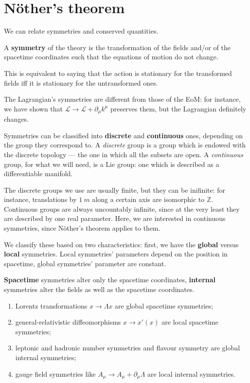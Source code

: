\documentclass[main.tex]{subfiles}
\begin{document}
\section{Nöther's theorem}


We can relate symmetries and conserved quantities. 

\begin{definition}
A \textbf{symmetry} of the theory is the transformation of the fields and/or of the spacetime coordinates such that the equations of motion do not change.
\end{definition}

This is equivalent to saying that the action is stationary for the transformed fields iff it is stationary for the untransformed ones. 

The Lagrangian's symmetries are different from those of the EoM: for instance, we have shown that \(\mathscr{L} \to \mathscr{L} + \partial_{\mu } k^{\mu }\) preserves them, but the Lagrangian definitely changes.

Symmetries can be classified into \textbf{discrete} and \textbf{continuous} ones, depending on the group they correspond to. 
A \emph{discrete} group is a group which is endowed with the discrete topology --- the one in which all the subsets are open. 
A \emph{continuous} group, for what we will need, is a Lie group: one which is described as a differentiable manifold. 

The discrete groups we use are usually finite, but they can be inifinite: for instance, translations by \(\SI{1}{m}\) along a certain axis are isomorphic to \(\mathbb{Z}\).  
Continuous groups are always uncountably infinite, since at the very least they are described by one real parameter. 
Here, we are interested in continuous symmetries, since Nöther's theorem applies to them.

We classify these based on two characteristics: first, we have the \textbf{global} versus \textbf{local} symmetries.
Local symmetries' parameters depend on the position in spacetime, global symmetries' parameter are constant. 

\textbf{Spacetime} symmetries alter only the spacetime coordinates, \textbf{internal} symmetries alter the fields as well as the spacetime coordinates. 

\begin{enumerate}
    \item Lorentz transformations \(x \to \Lambda x\) are global spacetime symmetries;
    \item general-relativistic diffeomorphisms \(x \to x'(x)\) are local spacetime symmetries;
    \item leptonic and hadronic number symmetries and flavour symmetry are global internal symmetries;
    \item gauge field symmetries like \(A_{\mu } \to A_{\mu } + \partial_{\mu } \Lambda \) are local internal symmetries. 
\end{enumerate}
\end{document}
